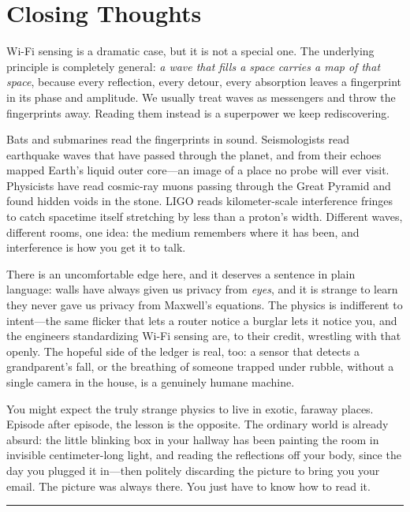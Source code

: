 \documentclass[11pt, letterpaper]{article}
\begin{document}
\section*{Closing Thoughts}

Wi-Fi sensing is a dramatic case, but it is not a special one. The underlying principle is completely general: \textit{a wave that fills a space carries a map of that space}, because every reflection, every detour, every absorption leaves a fingerprint in its phase and amplitude. We usually treat waves as messengers and throw the fingerprints away. Reading them instead is a superpower we keep rediscovering.

Bats and submarines read the fingerprints in sound. Seismologists read earthquake waves that have passed through the planet, and from their echoes mapped Earth's liquid outer core---an image of a place no probe will ever visit. Physicists have read cosmic-ray muons passing through the Great Pyramid and found hidden voids in the stone. LIGO reads kilometer-scale interference fringes to catch spacetime itself stretching by less than a proton's width. Different waves, different rooms, one idea: the medium remembers where it has been, and interference is how you get it to talk.

There is an uncomfortable edge here, and it deserves a sentence in plain language: walls have always given us privacy from \textit{eyes}, and it is strange to learn they never gave us privacy from Maxwell's equations. The physics is indifferent to intent---the same flicker that lets a router notice a burglar lets it notice you, and the engineers standardizing Wi-Fi sensing are, to their credit, wrestling with that openly. The hopeful side of the ledger is real, too: a sensor that detects a grandparent's fall, or the breathing of someone trapped under rubble, without a single camera in the house, is a genuinely humane machine.

You might expect the truly strange physics to live in exotic, faraway places. Episode after episode, the lesson is the opposite. The ordinary world is already absurd: the little blinking box in your hallway has been painting the room in invisible centimeter-long light, and reading the reflections off your body, since the day you plugged it in---then politely discarding the picture to bring you your email. The picture was always there. You just have to know how to read it.

\vspace{1cm}
\begin{center}
\rule{0.4\textwidth}{0.5pt}
\end{center}
\end{document}
